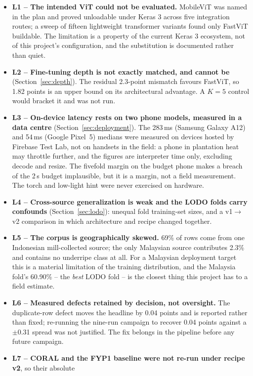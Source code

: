\documentclass{article}
\begin{document}
\begin{itemize}
  \item \textbf{L1 -- The intended ViT could not be evaluated.} MobileViT was named in the plan and proved
  unloadable under Keras 3 across five integration routes; a sweep of fifteen lightweight transformer
  variants found only FastViT buildable. The limitation is a property of the current Keras 3 ecosystem,
  not of this project's configuration, and the substitution is documented rather than quiet.
  \item \textbf{L2 -- Fine-tuning depth is not exactly matched, and cannot be} (Section~\ref{sec:depth}).
  The residual 2.3-point mismatch favours FastViT, so 1.82 points is an upper bound on its architectural
  advantage. A $K{=}5$ control would bracket it and was not run.
  \item \textbf{L3 -- On-device latency rests on two phone models, measured in a data centre}
  (Section~\ref{sec:deployment}). The 283\,ms (Samsung Galaxy A12) and 54\,ms (Google Pixel~5) medians were
  measured on devices hosted by Firebase Test Lab, not on handsets in the field: a phone in plantation heat
  may throttle further, and the figures are interpreter time only, excluding decode and resize. The
  fivefold margin on the budget phone makes a breach of the 2\,s budget implausible, but it is a margin, not
  a field measurement. The torch and low-light hint were never exercised on hardware.
  \item \textbf{L4 -- Cross-source generalization is weak and the LODO folds carry confounds}
  (Section~\ref{sec:lodo}): unequal fold training-set sizes, and a v1$\rightarrow$v2 comparison in which
  architecture and recipe changed together.
  \item \textbf{L5 -- The corpus is geographically skewed.} 69\% of rows come from one Indonesian
  mill-collected source; the only Malaysian source contributes 2.3\% and contains no underripe class at
  all. For a Malaysian deployment target this is a material limitation of the training distribution, and
  the Malaysia fold's 60.90\% -- the \textit{best} LODO fold -- is the closest thing this project has to a
  field estimate.
  \item \textbf{L6 -- Measured defects retained by decision, not oversight.} The duplicate-row defect moves
  the headline by 0.04 points and is reported rather than fixed; re-running the nine-run campaign to
  recover 0.04 points against a $\pm$0.31 spread was not justified. The fix belongs in the pipeline before
  any future campaign.
  \item \textbf{L7 -- CORAL and the FYP1 baseline were not re-run under recipe v2}, so their absolute

\end{itemize}
\end{document}
